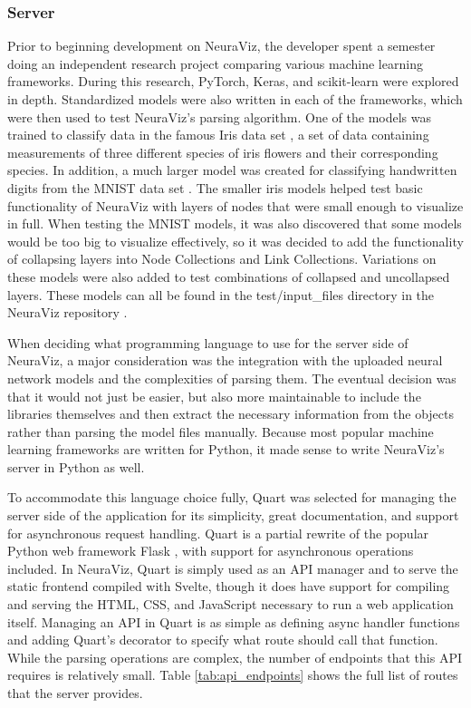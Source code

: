 \subsubsection{Server}
Prior to beginning development on NeuraViz, the developer spent a semester doing an independent research project comparing various machine learning frameworks. During this research, PyTorch, Keras, and scikit-learn \cite{scikit} were explored in depth. Standardized models were also written in each of the frameworks, which were then used to test NeuraViz's parsing algorithm. One of the models was trained to classify data in the famous Iris data set \cite{iris}, a set of data containing measurements of three different species of iris flowers and their corresponding species. In addition, a much larger model was created for classifying handwritten digits from the MNIST data set \cite{mnist}. The smaller iris models helped test basic functionality of NeuraViz with layers of nodes that were small enough to visualize in full. When testing the MNIST models, it was also discovered that some models would be too big to visualize effectively, so it was decided to add the functionality of collapsing layers into Node Collections and Link Collections. Variations on these models were also added to test combinations of collapsed and uncollapsed layers. These models can all be found in the test/input\_files directory in the NeuraViz repository \cite{neuraviz_repo}.

When deciding what programming language to use for the server side of NeuraViz, a major consideration was the integration with the uploaded neural network models and the complexities of parsing them. The eventual decision was that it would not just be easier, but also more maintainable to include the libraries themselves and then extract the necessary information from the objects rather than parsing the model files manually. Because most popular machine learning frameworks are written for Python, it made sense to write NeuraViz's server in Python as well. 

To accommodate this language choice fully, Quart \cite{quart} was selected for managing the server side of the application for its simplicity, great documentation, and support for asynchronous request handling. Quart is a partial rewrite of the popular Python web framework Flask \cite{flask}, with support for asynchronous operations included. In NeuraViz, Quart is simply used as an API manager and to serve the static frontend compiled with Svelte, though it does have support for compiling and serving the HTML, CSS, and JavaScript necessary to run a web application itself. Managing an API in Quart is as simple as defining async handler functions and adding Quart's decorator to specify what route should call that function. While the parsing operations are complex, the number of endpoints that this API requires is relatively small. Table \ref{tab:api_endpoints} shows the full list of routes that the server provides.

